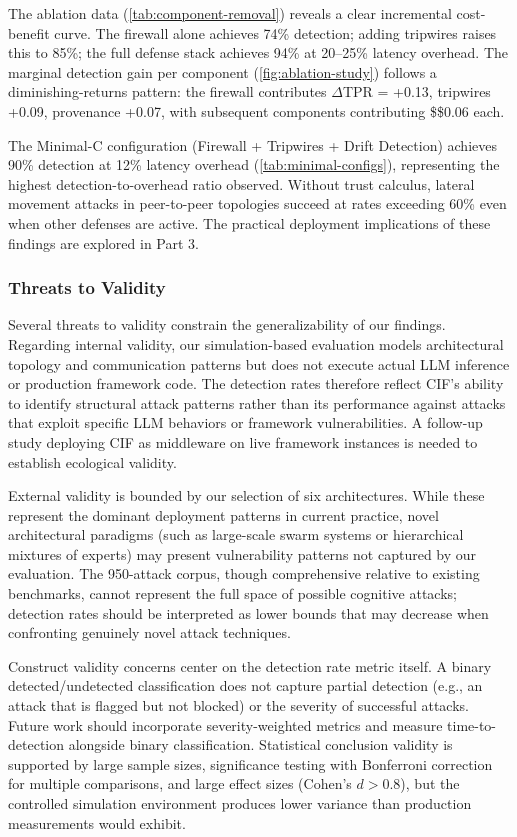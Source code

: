 \documentclass[
]{article}
\begin{document}
The ablation data (\cref{tab:component-removal}) reveals a clear
incremental cost-benefit curve. The firewall alone achieves 74\%
detection; adding tripwires raises this to 85\%; the full defense stack
achieves 94\% at 20--25\% latency overhead. The marginal detection gain
per component (\cref{fig:ablation-study}) follows a diminishing-returns
pattern: the firewall contributes \(\Delta\)TPR = +0.13, tripwires
+0.09, provenance +0.07, with subsequent components contributing
\$\leq\$0.06 each.

The Minimal-C configuration (Firewall + Tripwires + Drift Detection)
achieves 90\% detection at 12\% latency overhead
(\cref{tab:minimal-configs}), representing the highest
detection-to-overhead ratio observed. Without trust calculus, lateral
movement attacks in peer-to-peer topologies succeed at rates exceeding
60\% even when other defenses are active. The practical deployment
implications of these findings are explored in Part 3.

\subsubsection{Threats to Validity}\label{threats-to-validity}

Several threats to validity constrain the generalizability of our
findings. Regarding internal validity, our simulation-based evaluation
models architectural topology and communication patterns but does not
execute actual LLM inference or production framework code. The detection
rates therefore reflect CIF's ability to identify structural attack
patterns rather than its performance against attacks that exploit
specific LLM behaviors or framework vulnerabilities. A follow-up study
deploying CIF as middleware on live framework instances is needed to
establish ecological validity.

External validity is bounded by our selection of six architectures.
While these represent the dominant deployment patterns in current
practice, novel architectural paradigms (such as large-scale swarm
systems or hierarchical mixtures of experts) may present vulnerability
patterns not captured by our evaluation. The 950-attack corpus, though
comprehensive relative to existing benchmarks, cannot represent the full
space of possible cognitive attacks; detection rates should be
interpreted as lower bounds that may decrease when confronting genuinely
novel attack techniques.

Construct validity concerns center on the detection rate metric itself.
A binary detected/undetected classification does not capture partial
detection (e.g., an attack that is flagged but not blocked) or the
severity of successful attacks. Future work should incorporate
severity-weighted metrics and measure time-to-detection alongside binary
classification. Statistical conclusion validity is supported by large
sample sizes, significance testing with Bonferroni correction for
multiple comparisons, and large effect sizes (Cohen's \(d > 0.8\)), but
the controlled simulation environment produces lower variance than
production measurements would exhibit.
\end{document}
